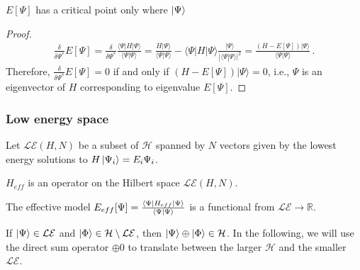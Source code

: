 \begin{theorem}
\label{theorem:criticalpoint}
$E[\Psi]$ has a critical point only where $\ket{\Psi}$ %
\end{theorem}
\begin{proof}
\begin{eqnarray}
\frac{\delta }{\delta \Psi^*}  E[\Psi] = \frac{\delta}{\delta \Psi^*}\frac{\langle \Psi |H|\Psi\rangle}{\langle \Psi |\Psi\rangle} = \frac{H|\Psi\rangle}{\langle \Psi |\Psi\rangle} - \langle \Psi |H|\Psi\rangle \frac{|\Psi \rangle}{|\langle \Psi | \Psi\rangle|^2} =\frac{ (H-E[\Psi])|\Psi\rangle }{\langle\Psi|\Psi\rangle}\,.
\end{eqnarray}
Therefore, 
$\frac{\delta }{\delta \Psi^*}  E[\Psi] = 0$ if and only if $(H-E[\Psi])|\Psi\rangle =0$, i.e., $\Psi$ is an eigenvector of $H$ corresponding to eigenvalue $E[\Psi]$.  
\end{proof}

\subsubsection{Low energy space} 

\begin{definition}
Let $\mathcal{LE}(H,N)$ be a subset of ${\mathcal H}$ spanned by $N$ vectors given by the lowest energy solutions to $H\ket{\Psi_i}=E_i{\Psi_i}$. 
\end{definition}

\begin{definition}
$H_{eff}$ is an operator on the Hilbert space ${\mathcal {LE}(H,N)}$.	 
\end{definition}

\begin{definition}
The effective model $E_{eff}[\Psi]=\frac{\bra{\Psi}H_{eff}\ket{\Psi}}{\braket{\Psi|\Psi}}$ is a functional from $\mathcal{LE} \rightarrow \mathbb{R}$. 
\end{definition}

If $\ket{\Psi}\in \mathcal{LE}$ and $\ket{\Phi}\in {\mathcal H} \setminus \mathcal{LE}$, then $\ket{\Psi} \oplus \ket{\Phi} \in {\mathcal H}$.
In the following, we will use the direct sum operator $\oplus 0$ to translate between the larger ${\mathcal H}$ and the smaller $\mathcal{LE}$. 

